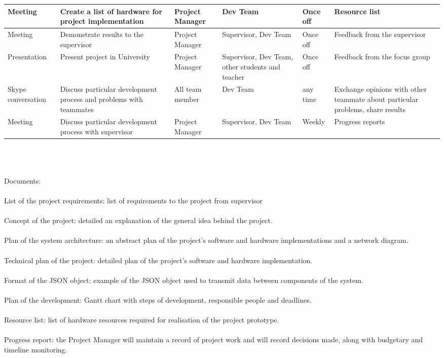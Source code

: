 \documentclass[english]{article}
\begin{document}
\begin{tabular}{|p{3cm}|p{5cm}|p{3cm}|p{4cm}|p{1.5cm}|p{5cm}|}
\hline 
Meeting & 
Create a list of hardware for project implementation &
Project Manager &
Dev Team &
Once off &
Resource list\\
\hline 
Meeting & 
Demonstrate results to the supervisor &
Project Manager &
Supervisor, Dev Team &
Once off &
Feedback from the supervisor\\
\hline 
Presentation & 
Present project in University &
Project Manager &
Supervisor, Dev Team, other students and teacher &
Once off &
Feedback from the focus group \\
\hline 
Skype conversation & 
Discuss particular development process and problems with teammates &
All team member &
Dev Team &
any time &
Exchange opinions with other teammate about particular problems, share results \\
\hline 
Meeting & 
Discuss particular development process with supervisor &
Project Manager &
Supervisor, Dev Team &
Weekly &
Progress reports\\
\hline 
\end{tabular}
\\\\\\
Documents: 
\\\\
List of the project requirements: list of requirements to the project from supervisor
\\\\
Concept of the project: detailed an explanation of the general idea behind the project.
\\\\
Plan of the system architecture: an abstract plan of the project's software and hardware implementations and a network diagram.
\\\\
Technical plan of the project: detailed plan of the project's software and hardware implementation.
\\\\
Format of the JSON object: example of the JSON object used to transmit data between components of the system.
\\\\
Plan of the development: Gantt chart with steps of development, responsible people and deadlines.
\\\\
Resource list: list of hardware resources required for realisation of the project prototype.
\\\\
Progress report: the Project Manager will maintain a record of project work and will record decisions made, along with budgetary and timeline monitoring.
\end{document}
